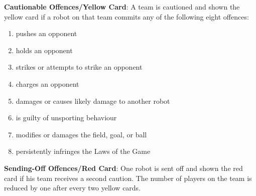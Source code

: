 \documentclass[12pt]{hurocup}
\begin{document}
\begin{lawlist}[US]

\item \textbf{Cautionable Offences/Yellow Card}: A team is cautioned
  and shown the yellow card if a robot on that team commits any of the
  following eight offences:
  \begin{enumerate}
    \item pushes an opponent
    \item holds an opponent
    \item strikes or attempts to strike an opponent
    \item charges an opponent
    \item damages or causes likely damage to another robot
    \item is guilty of unsporting behaviour
    \item modifies or damages the field, goal, or ball
    \item persistently infringes the Laws of the Game
  \end{enumerate}

\item \textbf{Sending-Off Offences/Red Card}: One robot is sent off
  and shown the red card if his team receives a second caution. The
  number of players on the team is reduced by one after every two
  yellow cards.

\end{lawlist}

\end{document}
